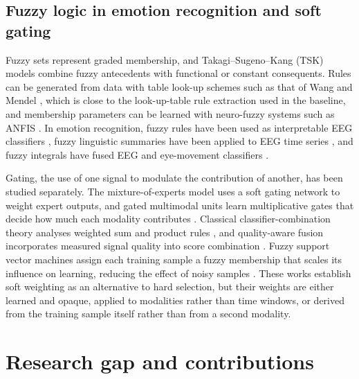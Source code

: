 \documentclass[11pt,a4paper]{article}
\begin{document}
\subsection{Fuzzy logic in emotion recognition and soft gating}
Fuzzy sets \cite{Zadeh1965} represent graded membership, and Takagi--Sugeno--Kang (TSK) models \cite{TakagiSugeno1985} combine fuzzy antecedents with functional or constant consequents. Rules can be generated from data with table look-up schemes such as that of Wang and Mendel \cite{WangMendel1992}, which is close to the look-up-table rule extraction used in the baseline, and membership parameters can be learned with neuro-fuzzy systems such as ANFIS \cite{Jang1993}. In emotion recognition, fuzzy rules have been used as interpretable EEG classifiers \cite{Matiko2014,FarhadiSedehi2024a}, fuzzy linguistic summaries have been applied to EEG time series \cite{Kaya2024}, and fuzzy integrals have fused EEG and eye-movement classifiers \cite{Lu2015,ChoKim1995}.

Gating, the use of one signal to modulate the contribution of another, has been studied separately. The mixture-of-experts model \cite{Jacobs1991} uses a soft gating network to weight expert outputs, and gated multimodal units learn multiplicative gates that decide how much each modality contributes \cite{Arevalo2020}. Classical classifier-combination theory analyses weighted sum and product rules \cite{Kittler1998}, and quality-aware fusion incorporates measured signal quality into score combination \cite{Nandakumar2008}. Fuzzy support vector machines assign each training sample a fuzzy membership that scales its influence on learning, reducing the effect of noisy samples \cite{LinWang2002}. These works establish soft weighting as an alternative to hard selection, but their weights are either learned and opaque, applied to modalities rather than time windows, or derived from the training sample itself rather than from a second modality.


\section{Research gap and contributions}
\label{sec:gap}
\end{document}
